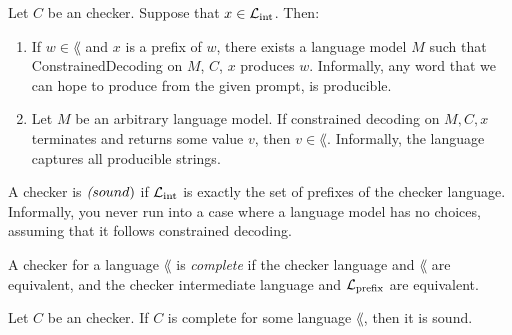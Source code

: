 \begin{theorem}
    \label{def:CheckerLanguageCorrect}
    Let $C$ be an checker. Suppose that $x \in \mathcal{L}_{\mathrm{int}}$. Then: 
    \begin{enumerate}
        \item If $w \in \lang$ and $x$ is a prefix of $w$, there exists a language model $M$ such that ConstrainedDecoding on $M$, $C$, $x$ produces $w$. Informally, any word that we can hope to produce from the given prompt, is producible.
        \item Let $M$ be an arbitrary language model. If constrained decoding on $M, C, x$ terminates and returns some value $v$, then $v \in \lang$. Informally, the language captures all producible strings.
    \end{enumerate}
\end{theorem}

\begin{definition}
    \label{def:CheckerSound}
    A checker is $\emph(sound)$ if $\mathcal{L}_{\mathrm{int}}$ is exactly the set of prefixes of the checker language. Informally, you never run into a case where a language model has no choices, assuming that it follows constrained decoding.
\end{definition}

\begin{definition}
    \label{def:CheckerComplete}
    A checker for a language $\lang$ is \emph{complete} if the checker language and $\lang$ are equivalent, and the checker intermediate language and $\mathcal{L}_{\mathrm{prefix}}$ are equivalent. 
\end{definition}

\begin{theorem}
    \label{def:CheckerCompleteImplesSound}
    Let $C$ be an checker. If $C$ is complete for some language $\lang$, then it is sound.
\end{theorem}


